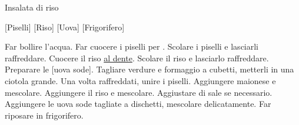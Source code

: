 \begin{recipe}[label=insalata_di_riso]{Insalata di riso}
    \begin{header}
    
        [Piselli]
        [Riso]
        [Uova]
        [Frigorifero]
    \end{header}
    
    \begin{ingredients}[10]
    \end{ingredients}
    
    \begin{preparation}
        \step Far bollire l'acqua.
        \step Far cuocere i piselli per .
        \step Scolare i piselli e lasciarli raffreddare.
        \step Cuocere il riso \underline{al dente}.
        \step Scolare il riso e lasciarlo raffreddare.
        \step Preparare le [uova sode].
        \step Tagliare verdure e formaggio a cubetti, metterli in una ciotola grande.
        \step Una volta raffreddati, unire i piselli.
        \step Aggiungere maionese e mescolare.
        \step Aggiungere il riso e mescolare.
        \step Aggiustare di sale se necessario.
        \step Aggiungere le uova sode tagliate a dischetti, mescolare delicatamente.
        \step Far riposare in frigorifero.
    \end{preparation}
\end{recipe}